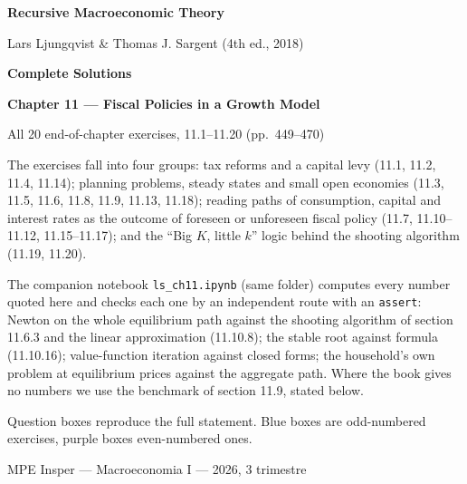 \documentclass[12pt, letterpaper]{article}
\begin{document}
\begin{titlepage}
\centering
\vspace*{2.5cm}
{\Huge\bfseries\color{darkblue} Recursive Macroeconomic Theory\par}
\vspace{6pt}
{\large Lars Ljungqvist \& Thomas J. Sargent (4th ed., 2018)\par}
\vspace{1.4cm}
{\LARGE\bfseries Complete Solutions\par}
\vspace{6pt}
{\LARGE\bfseries Chapter 11 --- Fiscal Policies in a Growth Model\par}
\vspace{1.2cm}
{\large All 20 end-of-chapter exercises, 11.1--11.20 (pp.~449--470)\par}
\vspace{2cm}

\begin{tcolorbox}[theorybox,title={What is in this file},width=0.86\textwidth]
\small
The exercises fall into four groups: tax reforms and a capital levy (11.1, 11.2, 11.4, 11.14); planning problems,
steady states and small open economies (11.3, 11.5, 11.6, 11.8, 11.9, 11.13, 11.18); reading paths of consumption,
capital and interest rates as the outcome of foreseen or unforeseen fiscal policy (11.7, 11.10--11.12, 11.15--11.17);
and the ``Big $K$, little $k$'' logic behind the shooting algorithm (11.19, 11.20).

\smallskip
The companion notebook \texttt{ls\_ch11.ipynb} (same folder) computes every number quoted here and checks each one by
an independent route with an \texttt{assert}: Newton on the whole equilibrium path against the shooting algorithm of
section 11.6.3 and the linear approximation (11.10.8); the stable root against formula (11.10.16); value-function
iteration against closed forms; the household's own problem at equilibrium prices against the aggregate path. Where
the book gives no numbers we use the benchmark of section 11.9, stated below.

\smallskip
Question boxes reproduce the full statement. Blue boxes are odd-numbered exercises, purple boxes
even-numbered ones.
\end{tcolorbox}

\vfill
{\small MPE Insper --- Macroeconomia I --- 2026, 3\textordmasculine{} trimestre\par}
\end{titlepage}
\end{document}
